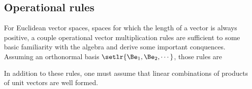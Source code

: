 
\subsection{Operational rules}
For Euclidean vector spaces, spaces for which the length of a vector is always positive, a couple operational vector multiplication rules are sufficient to some basic familiarity with the algebra and derive some important conquences.
Assuming an orthonormal basis \( \setlr{ \Be_1, \Be_2, \cdots } \), those rules are



In addition to these rules, one must assume that linear combinations of products of unit vectors are well formed.
